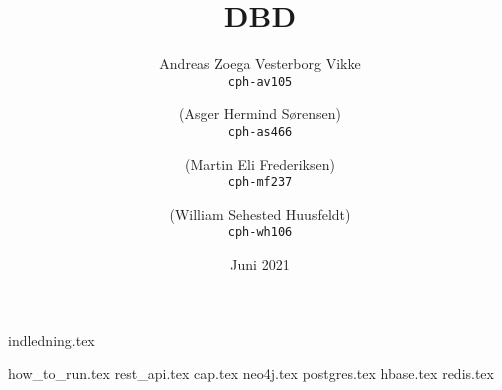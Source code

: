 \documentclass[10pt]{article}
\title{DBD}
\author{
    Andreas Zoega Vesterborg Vikke\\
    \texttt{cph-av105}
    \and
    (Asger Hermind Sørensen)\\
    \texttt{cph-as466}
    \and
    (Martin Eli Frederiksen)\\
    \texttt{cph-mf237}
    \and
    (William Sehested Huusfeldt)\\
    \texttt{cph-wh106}
}
\date{Juni 2021}
\begin{document}
\hypersetup{pageanchor=false}

\listoftodos
{}

\maketitle
\newpage
{indledning.tex}
\tableofcontents
\newpage

{how_to_run.tex}
\newpage
{rest_api.tex}
{cap.tex}
{neo4j.tex}
{postgres.tex}
{hbase.tex}
{redis.tex}

\newpage


\end{document}
